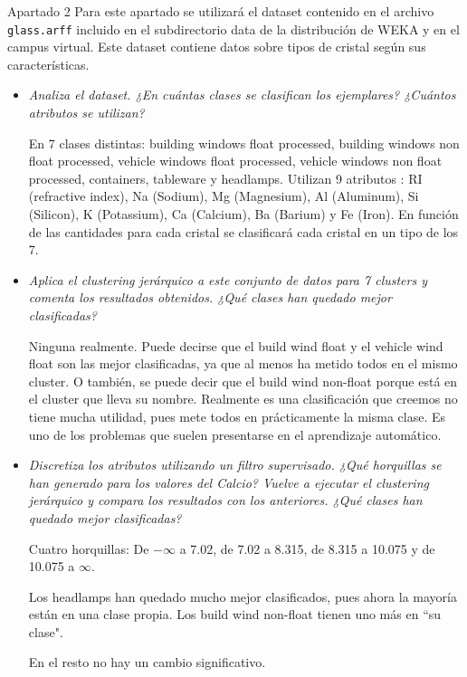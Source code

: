 \documentclass[11pt, a4paper, spanish, openright, twoside]{book}
\begin{document}
\begin{section}{Apartado 2}
	Para este apartado se utilizará el dataset contenido en el archivo \texttt{glass.arff} incluido en el subdirectorio
	data de la distribución de WEKA y en el campus virtual. Este dataset contiene datos sobre tipos de
	cristal según sus características.

	\begin{itemize}
	\item \textit{Analiza el dataset. ¿En cuántas clases se clasifican los ejemplares? ¿Cuántos atributos se utilizan?}

	En 7 clases distintas: building windows float processed, building windows non float processed, vehicle windows float  processed,  vehicle windows non float processed, containers, tableware y headlamps.
	Utilizan 9 atributos : RI (refractive index),  Na (Sodium), Mg (Magnesium),  Al (Aluminum), Si (Silicon),  K (Potassium), Ca (Calcium), Ba (Barium) y Fe (Iron). En función de las cantidades para cada cristal se clasificará cada 
	cristal en un tipo de los 7.

	\item \textit{Aplica el clustering jerárquico a este conjunto de datos para 7 clusters y comenta los resultados 
	obtenidos. ¿Qué clases han quedado mejor clasificadas?}
	
	Ninguna realmente. Puede decirse que el build wind float y el vehicle wind float son las mejor clasificadas, ya que al menos ha metido todos en el mismo cluster. O también, se puede decir que 
	el build wind non-float porque está en el cluster que lleva su nombre. Realmente es una clasificación que creemos no tiene mucha utilidad, pues mete todos en prácticamente la misma clase. 
	Es uno de los problemas que suelen presentarse en  el aprendizaje automático.
	
	\item \textit{Discretiza los atributos utilizando un filtro supervisado. ¿Qué horquillas se han generado para los 
	valores del Calcio? Vuelve a ejecutar el clustering jerárquico y compara los resultados con los 
	anteriores. ¿Qué clases han quedado mejor clasificadas?}

	Cuatro horquillas: De $-\infty$ a 7.02, de 7.02 a 8.315, de 8.315 a 10.075 y de 10.075 a $\infty$.

	Los headlamps han quedado mucho mejor clasificados, pues ahora la mayoría están en una clase propia. Los build wind non-float tienen uno más en ``su clase".

	En el resto no hay un cambio significativo.


\end{itemize}
\end{section}
\end{document}

